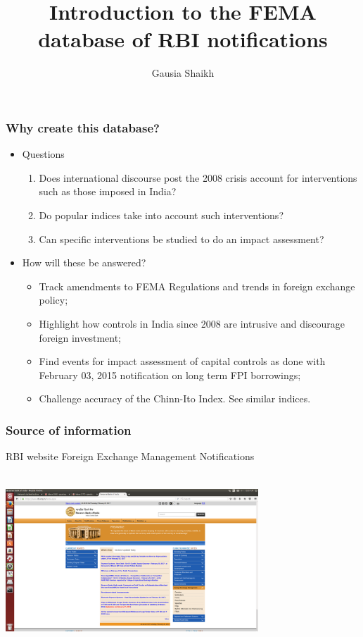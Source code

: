 \documentclass{beamer}
\title{Introduction to the FEMA database of RBI notifications}
\author{Gausia Shaikh}
\begin{document}
\begin{frame}
\maketitle
\end{frame}
\begin{frame}
\frametitle{Why create this database?}
\begin{itemize}
\item Questions
\begin{enumerate}
\item Does international discourse post the 2008 crisis account for interventions such as those imposed in India?
\item Do popular indices take into account such interventions?
\item Can specific interventions be studied to do an impact assessment?
\end{enumerate}
\item How will these be answered?
\begin{itemize}
\item Track amendments to FEMA Regulations and trends in foreign exchange policy;
\item Highlight how controls in India since 2008 are intrusive and discourage foreign investment;
\item Find events for impact assessment of capital controls as done with February 03, 2015 notification on long term FPI borrowings;
\item Challenge accuracy of the Chinn-Ito Index. See similar indices.
\end{itemize}
\end{itemize}
\end{frame}
\begin{frame}
\frametitle{Source of information}
RBI website \textrightarrow Foreign Exchange Management \textrightarrow Notifications
\begin{center}
\includegraphics[height=65mm, width=95mm]{PICTURES/20170221_RBIHome.png}
\end{center}
\end{frame}
\end{document}
